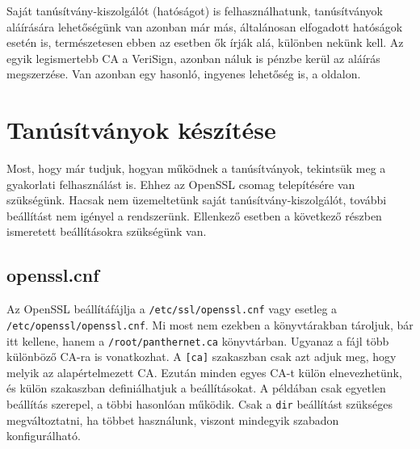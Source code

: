 Saját tanúsítvány-kiszolgálót (hatóságot) is felhasználhatunk, tanúsítványok aláírására lehetőségünk van azonban már
más, általánosan elfogadott hatóságok esetén is, természetesen ebben az esetben ők írják alá, különben nekünk kell. Az
egyik legismertebb CA a VeriSign, azonban náluk is pénzbe kerül az aláírás megszerzése. Van azonban egy hasonló,
ingyenes lehetőség is, a  oldalon.

\section{Tanúsítványok készítése}
Most, hogy már tudjuk, hogyan működnek a tanúsítványok, tekintsük meg a gyakorlati felhasználást is. Ehhez az OpenSSL
csomag telepítésére van szükségünk. Hacsak nem üzemeltetünk saját tanúsítvány-kiszolgálót, további beállítást nem
igényel a rendszerünk. Ellenkező esetben a következő részben ismeretett beállításokra szükségünk van.

\subsection{openssl.cnf}
Az OpenSSL beállítáfájlja a \texttt{/etc/ssl/openssl.cnf} vagy esetleg a \texttt{/etc/openssl/openssl.cnf}. Mi most nem
ezekben a könyvtárakban tároljuk, bár itt kellene, hanem a \texttt{/root/panthernet.ca} könyvtárban. Ugyanaz a fájl több
különböző CA-ra is vonatkozhat. A \texttt{[ca]} szakaszban csak azt adjuk meg, hogy melyik az alapértelmezett CA. Ezután
minden egyes CA-t külön elnevezhetünk, és külön szakaszban definiálhatjuk a beállításokat. A példában csak egyetlen
beállítás szerepel, a többi hasonlóan működik. Csak a \texttt{dir} beállítást szükséges megváltoztatni, ha többet
használunk, viszont mindegyik szabadon konfigurálható.

